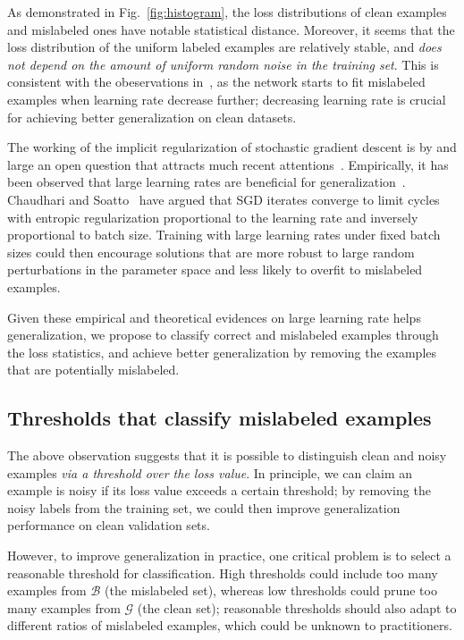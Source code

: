 \documentclass[a4paper,11pt]{article}
\newcommand{\mc}[1]{\mathcal{#1}}
\begin{document}
As demonstrated in Fig.~\ref{fig:histogram}, the loss distributions of clean examples and mislabeled ones have notable statistical distance. Moreover, it seems that the loss distribution of the uniform labeled examples are relatively stable, and \textit{does not depend on the amount of uniform random noise in the training set}.
This is consistent with the obeservations in~\cite{zhang2016understanding}, as the network starts to fit mislabeled examples when learning rate decrease further; decreasing learning rate is crucial for achieving better generalization on clean datasets.

The working of the implicit regularization of stochastic gradient descent is by and large an open question that attracts much recent attentions~\cite{neyshabur2017implicit,li2017algorithmic,du2018algorithmic,mandt2017stochastic}. Empirically, it has been observed that large learning rates are beneficial for generalization~\cite{kleinberg2018an}. Chaudhari and Soatto~\cite{chaudhari2018stochastic} have argued that SGD iterates converge to limit cycles with entropic regularization proportional to the learning rate and inversely proportional to batch size. Training with large learning rates under fixed batch sizes could then encourage solutions that are more robust to large random perturbations in the parameter space and less likely to overfit to mislabeled examples.

Given these empirical and theoretical evidences on large learning rate helps generalization, we propose to classify correct and mislabeled examples through the loss statistics, and achieve better generalization by removing the examples that are potentially mislabeled.









\subsection{Thresholds that classify mislabeled examples}
The above observation suggests that it is possible to distinguish clean and noisy examples \textit{via a threshold over the loss value}. In principle, we can claim an example is noisy if its loss value exceeds a certain threshold; by removing the noisy labels from the training set, we could then improve generalization performance on clean validation sets.

However, to improve generalization in practice, one critical problem is to select a reasonable threshold for classification. High thresholds could include too many examples from $\mc{B}$ (the mislabeled set), whereas low thresholds could prune too many examples from $\mc{G}$ (the clean set); reasonable thresholds should also adapt to different ratios of mislabeled examples, which could be unknown to practitioners. 
\end{document}
